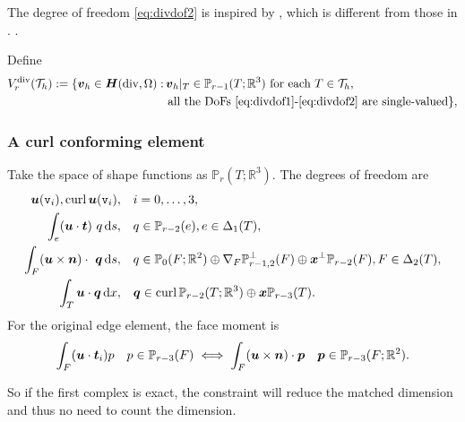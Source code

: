 \documentclass[10pt]{amsart}
\begin{document}
The degree of freedom \eqref{eq:divdof2} is inspired by \cite{Chen;Huang:2020Discrete}, which is different from those in \cite{Stenberg2010}.
.

Define
\begin{align*}
V_r^{\operatorname{div}}(\mathcal T_h):=\{\boldsymbol v_h\in \boldsymbol H(\operatorname{div}, \Omega):&\, \boldsymbol v_h|_T\in\mathbb P_{r-1}(T;\mathbb R^3) \textrm{ for each } T\in\mathcal T_h, \\
&\textrm{ all the DoFs \eqref{eq:divdof1}-\eqref{eq:divdof2} are single-valued}\},
\end{align*}



\subsubsection{A curl conforming element}
Take the space of shape functions as $\mathbb{P}_{r}(T;\mathbb R^3)$. The degrees of freedom are
\begin{align}
\label{eq:curldof1}
\boldsymbol u(\texttt{v}_i), {\rm curl\,}\boldsymbol u(\texttt{v}_i),& \quad i=0,\ldots, 3, \\
\label{eq:curldof2}
\int_e (\boldsymbol u\cdot \boldsymbol t)\ q \,{\rm d} s, &\quad q\in\mathbb P_{r-2}(e), e\in\Delta_{1}(T),\\
\label{eq:curldof3}
\int_F (\boldsymbol u\times \boldsymbol n)\cdot\ \boldsymbol q \,{\rm d} s, &\quad q\in \mathbb P_{0}(F;\mathbb R^2)\oplus\nabla_F\mathbb P_{r-1,2}^{\perp}(F)\oplus \boldsymbol x^{\perp}\mathbb P_{r-2}(F), F\in\Delta_{2}(T),\\
\label{eq:curldof4}
\int_T \boldsymbol u\cdot \boldsymbol q \,{\rm d} x, &\quad \boldsymbol q\in{\rm curl\,}\mathbb P_{r-2}(T;\mathbb R^3)\oplus\boldsymbol x\mathbb P_{r-3}(T).
\end{align}
For the original edge element, the face moment is
$$
\int_F (\boldsymbol u\cdot \boldsymbol t_i) p\quad p\in \mathbb P_{r-3}(F) \iff \int_F (\boldsymbol u\times \boldsymbol n) \cdot \boldsymbol p\quad \boldsymbol p\in \mathbb P_{r-3}(F; \mathbb R^2).
$$


So if the first complex is exact, the constraint will reduce the matched dimension and thus no need to count the dimension. 
\end{document}

